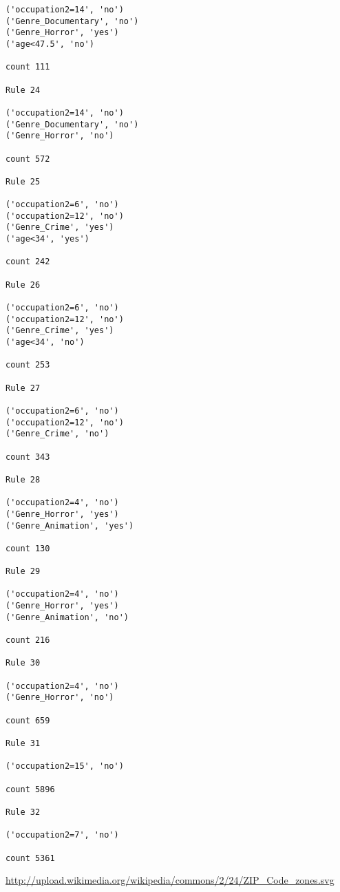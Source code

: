 \documentclass[12pt,fleqn]{article}\usepackage{../common}
\begin{document}
\begin{verbatim}
('occupation2=14', 'no')
('Genre_Documentary', 'no')
('Genre_Horror', 'yes')
('age<47.5', 'no')

count 111

Rule 24

('occupation2=14', 'no')
('Genre_Documentary', 'no')
('Genre_Horror', 'no')

count 572

Rule 25

('occupation2=6', 'no')
('occupation2=12', 'no')
('Genre_Crime', 'yes')
('age<34', 'yes')

count 242

Rule 26

('occupation2=6', 'no')
('occupation2=12', 'no')
('Genre_Crime', 'yes')
('age<34', 'no')

count 253

Rule 27

('occupation2=6', 'no')
('occupation2=12', 'no')
('Genre_Crime', 'no')

count 343

Rule 28

('occupation2=4', 'no')
('Genre_Horror', 'yes')
('Genre_Animation', 'yes')

count 130

Rule 29

('occupation2=4', 'no')
('Genre_Horror', 'yes')
('Genre_Animation', 'no')

count 216

Rule 30

('occupation2=4', 'no')
('Genre_Horror', 'no')

count 659

Rule 31

('occupation2=15', 'no')

count 5896

Rule 32

('occupation2=7', 'no')

count 5361

\end{verbatim}








\url{http://upload.wikimedia.org/wikipedia/commons/2/24/ZIP_Code_zones.svg}
\end{document}
